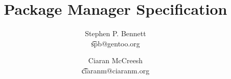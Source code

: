\documentclass[a4paper,12pt]{report}
\title{Package Manager Specification}
\author{Stephen P. Bennett\\\t{spb@gentoo.org}
\and Ciaran McCreesh\\\t{ciaranm@ciaranm.org}}
\begin{document}
\maketitle

\tableofcontents
\listofalgorithms
\lstlistoflistings
\listoffixmes






























\end{document}
